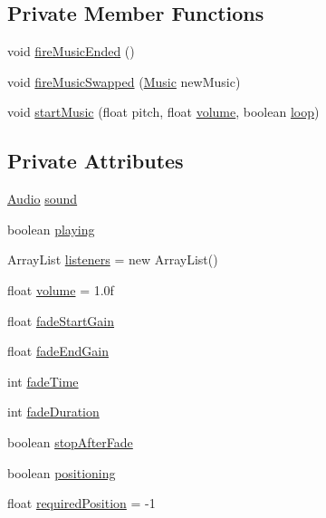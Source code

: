 \subsection*{Private Member Functions}
\begin{DoxyCompactItemize}
\item 
void \mbox{\hyperlink{classorg_1_1newdawn_1_1slick_1_1_music_af35afdd15c12852bb797b5661e7f46b6}{fire\+Music\+Ended}} ()
\item 
void \mbox{\hyperlink{classorg_1_1newdawn_1_1slick_1_1_music_af4a8c635af98f064cc069383e64eed66}{fire\+Music\+Swapped}} (\mbox{\hyperlink{classorg_1_1newdawn_1_1slick_1_1_music}{Music}} new\+Music)
\item 
void \mbox{\hyperlink{classorg_1_1newdawn_1_1slick_1_1_music_afe4ced4d5134a3bfea291254e6fd2934}{start\+Music}} (float pitch, float \mbox{\hyperlink{classorg_1_1newdawn_1_1slick_1_1_music_a2fa10b80767b1a05925e1dc89a088e90}{volume}}, boolean \mbox{\hyperlink{classorg_1_1newdawn_1_1slick_1_1_music_aadc35375936c47d7a0e40cd1d719d070}{loop}})
\end{DoxyCompactItemize}
\subsection*{Private Attributes}
\begin{DoxyCompactItemize}
\item 
\mbox{\hyperlink{interfaceorg_1_1newdawn_1_1slick_1_1openal_1_1_audio}{Audio}} \mbox{\hyperlink{classorg_1_1newdawn_1_1slick_1_1_music_a17daed326f24bf361ff8677c33f06b2f}{sound}}
\item 
boolean \mbox{\hyperlink{classorg_1_1newdawn_1_1slick_1_1_music_aa81bfb24e3203b254c58425195ab17b7}{playing}}
\item 
Array\+List \mbox{\hyperlink{classorg_1_1newdawn_1_1slick_1_1_music_ad57b22ce1f989d377f00f3c804a41db4}{listeners}} = new Array\+List()
\item 
float \mbox{\hyperlink{classorg_1_1newdawn_1_1slick_1_1_music_a2fa10b80767b1a05925e1dc89a088e90}{volume}} = 1.\+0f
\item 
float \mbox{\hyperlink{classorg_1_1newdawn_1_1slick_1_1_music_adae9aee08679631db780fea46d48735d}{fade\+Start\+Gain}}
\item 
float \mbox{\hyperlink{classorg_1_1newdawn_1_1slick_1_1_music_a12c7133766d347ffbcf8d6e506165251}{fade\+End\+Gain}}
\item 
int \mbox{\hyperlink{classorg_1_1newdawn_1_1slick_1_1_music_a83dfc85ef4588e511d667c78e882f3f3}{fade\+Time}}
\item 
int \mbox{\hyperlink{classorg_1_1newdawn_1_1slick_1_1_music_adf35608195f978bed903af885397dd75}{fade\+Duration}}
\item 
boolean \mbox{\hyperlink{classorg_1_1newdawn_1_1slick_1_1_music_af40d098a3f18a0235d9daab0844edf7a}{stop\+After\+Fade}}
\item 
boolean \mbox{\hyperlink{classorg_1_1newdawn_1_1slick_1_1_music_a5b37d26c143b07b08eac2b3d79f940b9}{positioning}}
\item 
float \mbox{\hyperlink{classorg_1_1newdawn_1_1slick_1_1_music_ac983016dac747c325214ae019b79d0f0}{required\+Position}} = -\/1
\end{DoxyCompactItemize}
